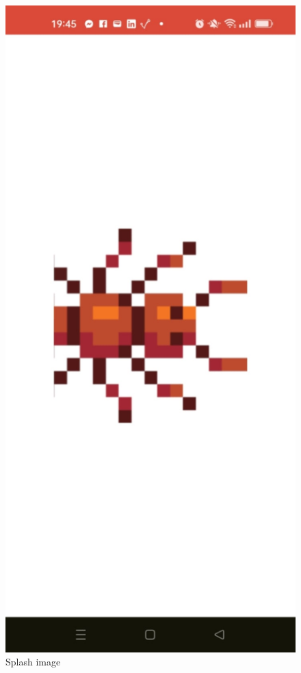 \documentclass[a4paper,12pt]{article}
\begin{document}
\begin{figure}[H]
    \centering
    \includegraphics[width=1\textwidth]{images/splash.jpg}
    \caption{Splash image}
\end{figure}
\end{document}
